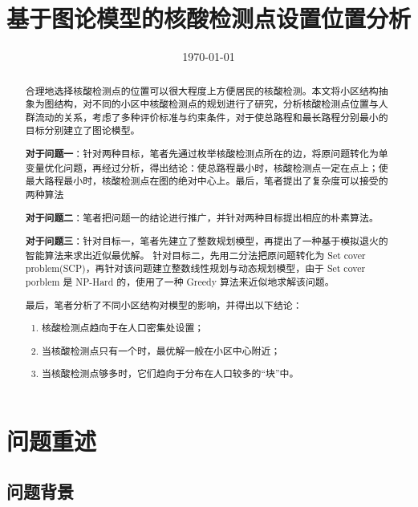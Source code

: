 \documentclass{cumcmthesis}
\title{基于图论模型的核酸检测点设置位置分析}
\date{\today}
\begin{document}
\maketitle

\begin{abstract}

合理地选择核酸检测点的位置可以很大程度上方便居民的核酸检测。本文将小区结构抽象为图结构，对不同的小区中核酸检测点的规划进行了研究，分析核酸检测点位置与人群流动的关系，考虑了多种评价标准与约束条件，对于使总路程和最长路程分别最小的目标分别建立了图论模型。

\textbf{对于问题一}：针对两种目标，笔者先通过枚举核酸检测点所在的边，将原问题转化为单变量优化问题，再经过分析，得出结论：使总路程最小时，核酸检测点一定在点上；使最大路程最小时，核酸检测点在图的绝对中心上。最后，笔者提出了复杂度可以接受的两种算法

\textbf{对于问题二}：笔者把问题一的结论进行推广，并针对两种目标提出相应的朴素算法。

\textbf{对于问题三}：针对目标一，笔者先建立了整数规划模型，再提出了一种基于模拟退火的智能算法来求出近似最优解。
针对目标二，先用二分法把原问题转化为 Set cover problem(SCP)，再针对该问题建立整数线性规划与动态规划模型，由于 Set cover porblem 是 NP-Hard 的，使用了一种 Greedy 算法来近似地求解该问题。

最后，笔者分析了不同小区结构对模型的影响，并得出以下结论：

\begin{enumerate}
    \item 核酸检测点趋向于在人口密集处设置；
    \item 当核酸检测点只有一个时，最优解一般在小区中心附近；
    \item 当核酸检测点够多时，它们趋向于分布在人口较多的“块”中。
\end{enumerate}



\end{abstract}


\section{问题重述}

\subsection{问题背景}
\end{document}
